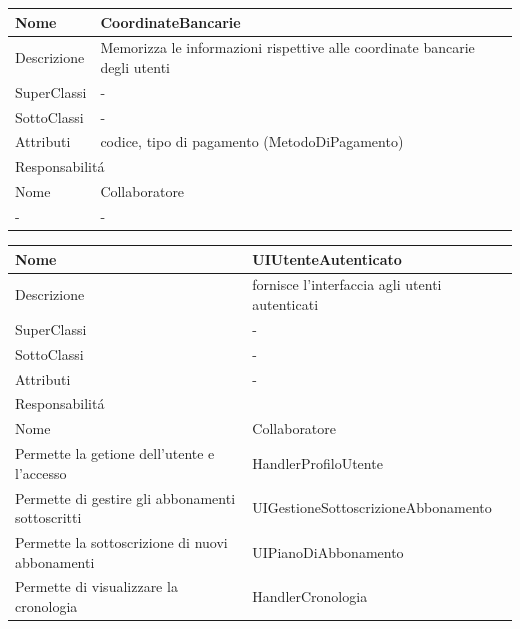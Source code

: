 \begin{center} %
    \begin{longtable}{ |p{3cm}|p{3cm}|p{3cm}|p{3cm}| }
        \hline
        Nome & \multicolumn{3}{|p{9cm}|}{CoordinateBancarie} \\\hline
        Descrizione & \multicolumn{3}{|p{9cm}|}{Memorizza le informazioni rispettive alle coordinate bancarie degli utenti} \\\hline
        SuperClassi & \multicolumn{3}{|p{9cm}|}{-} \\\hline
        SottoClassi & \multicolumn{3}{|p{9cm}|}{-} \\\hline
        Attributi & \multicolumn{3}{|p{9cm}|}{codice, tipo di pagamento (MetodoDiPagamento)} \\\hline
        \multicolumn{4}{|p{12cm}|}{Responsabilit\'a} \\\hline %
        \multicolumn{2}{|p{6cm}|}{Nome} & \multicolumn{2}{|p{6cm}|}{Collaboratore} \\\hline %
        \multicolumn{2}{|p{6cm}|}{-} & \multicolumn{2}{|p{6cm}|}{-} \\\hline
    \end{longtable}
\end{center}

\begin{center} %
    \begin{longtable}{ |p{3cm}|p{3cm}|p{3cm}|p{3cm}| }
        \hline
        Nome & \multicolumn{3}{|p{9cm}|}{UIUtenteAutenticato} \\\hline
        Descrizione & \multicolumn{3}{|p{9cm}|}{fornisce l'interfaccia agli utenti autenticati} \\\hline
        SuperClassi & \multicolumn{3}{|p{9cm}|}{-} \\\hline
        SottoClassi & \multicolumn{3}{|p{9cm}|}{-} \\\hline
        Attributi & \multicolumn{3}{|p{9cm}|}{-} \\\hline
        \multicolumn{4}{|p{12cm}|}{Responsabilit\'a} \\\hline %
        \multicolumn{2}{|p{6cm}|}{Nome} & \multicolumn{2}{|p{6cm}|}{Collaboratore} \\\hline %
        \multicolumn{2}{|p{6cm}|}{Permette la getione dell'utente e l'accesso} & \multicolumn{2}{|p{6cm}|}{HandlerProfiloUtente} \\\hline
        \multicolumn{2}{|p{6cm}|}{Permette di gestire gli abbonamenti sottoscritti} & \multicolumn{2}{|p{6cm}|}{UIGestioneSottoscrizioneAbbonamento} \\\hline
        \multicolumn{2}{|p{6cm}|}{Permette la sottoscrizione di nuovi abbonamenti} & \multicolumn{2}{|p{6cm}|}{UIPianoDiAbbonamento} \\\hline
        \multicolumn{2}{|p{6cm}|}{Permette di visualizzare la cronologia} & \multicolumn{2}{|p{6cm}|}{HandlerCronologia} \\\hline
    \end{longtable}
\end{center}

